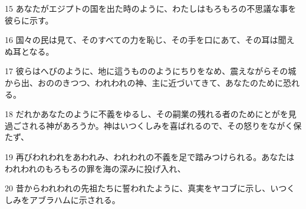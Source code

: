 \par 15 あなたがエジプトの国を出た時のように、わたしはもろもろの不思議な事を彼らに示す。
\par 16 国々の民は見て、そのすべての力を恥じ、その手を口にあて、その耳は聞えぬ耳となる。
\par 17 彼らはへびのように、地に這うもののようにちりをなめ、震えながらその城から出、おののきつつ、われわれの神、主に近づいてきて、あなたのために恐れる。
\par 18 だれかあなたのように不義をゆるし、その嗣業の残れる者のためにとがを見過ごされる神があろうか。神はいつくしみを喜ばれるので、その怒りをながく保たず、
\par 19 再びわれわれをあわれみ、われわれの不義を足で踏みつけられる。あなたはわれわれのもろもろの罪を海の深みに投げ入れ、
\par 20 昔からわれわれの先祖たちに誓われたように、真実をヤコブに示し、いつくしみをアブラハムに示される。


